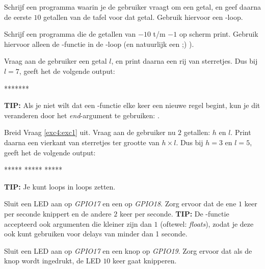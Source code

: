 \begin{exercise}
Schrijf een programma waarin je de gebruiker vraagt om een getal, en geef daarna de eerste $10$ getallen van de tafel voor dat getal. Gebruik hiervoor een -loop.
\end{exercise}

\begin{exercise}
Schrijf een programma die de getallen van $-10$ t/m $-1$ op scherm print. Gebruik hiervoor alleen de -functie in de -loop (en natuurlijk een  ;) ).
\end{exercise}

\begin{exercise}\label{exc5:exc4}
Vraag aan de gebruiker een getal $l$, en print daarna een rij van sterretjes. Dus bij $l=7$, geeft het de volgende output:
\begin{python}
*******
\end{python}
\textbf{TIP:} Als je niet wilt dat een -functie elke keer een nieuwe regel begint, kun je dit veranderen door het \textit{end}-argument te gebruiken: . 
\end{exercise}


\begin{exercise}
Breid Vraag \ref{exc4:exc1} uit. Vraag aan de gebruiker nu $2$ getallen: $h$ en $l$. Print daarna een vierkant van sterretjes ter grootte van $h \times l$. Dus bij $h=3$ en $l=5$, geeft het de volgende output:
\begin{python}
*****
*****
*****
\end{python}
\textbf{TIP:} Je kunt loops in loops zetten. 
\end{exercise}

\begin{exercise}
Sluit een LED aan op \textit{GPIO17} en een op \textit{GPIO18}. Zorg ervoor dat de ene $1$ keer per seconde knippert en de andere $2$ keer per seconde. \newline
\textbf{TIP:} De -functie accepteerd ook argumenten die kleiner zijn dan $1$ (oftewel: \textit{floats}), zodat je deze ook kunt gebruiken voor delays van minder dan 1 seconde.
\end{exercise}

\begin{exercise}
Sluit een LED aan op \textit{GPIO17} en een knop op \textit{GPIO19}. Zorg ervoor dat als de knop wordt ingedrukt, de LED $10$ keer gaat knipperen. 
\end{exercise}
